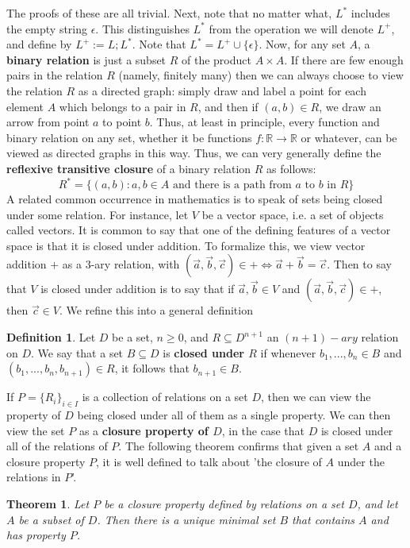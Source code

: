 \documentclass{article}
\theoremstyle{definition}
\newtheorem{definition}{Definition}[section]
\theoremstyle{plain}
\theoremstyle{theorem}
\newtheorem{theorem}{Theorem}[section]
\begin{document}
The proofs of these are all trivial. Next, note that no matter what, $L^*$ includes the empty string $\epsilon$. This distinguishes $L^*$ from the operation we will denote $L^+$, and define by $L^+ := L;L^*$. Note that $L^* = L^+ \cup \{\epsilon\}$.
Now, for any set $A$, a \textbf{binary relation} is just a subset $R$ of the product $A \times A$. If there are few enough pairs in the relation $R$ (namely, finitely many) then we can always choose to view the relation $R$ as a directed graph: simply draw and label a point for each element $A$ which belongs to a pair in $R$, and then if $(a,b) \in R$, we draw an arrow from point $a$ to point $b$. Thus, at least in principle, every function and binary relation on any set, whether it be functions $f:\mathbb{R} \to \mathbb{R}$ or whatever, can be viewed as directed graphs in this way. Thus, we can very generally define the \textbf{reflexive transitive closure} of a binary relation $R$ as follows:
 \[ R^* = \{ (a,b): a,b \in A \textrm{ and there is a path from $a$ to $b$ in $R$} \} \]
A related common occurrence in mathematics is to speak of sets being closed under some relation. For instance, let $V$ be a vector space, i.e. a set of objects called vectors. It is common to say that one of the defining features of a vector space is that it is closed under addition. To formalize this, we view vector addition $+$ as a $3$-ary relation, with $(\vec{a},\vec{b},\vec{c}) \in + \iff \vec{a}+\vec{b}=\vec{c}$. Then to say that $V$ is closed under addition is to say that if $\vec{a},\vec{b} \in V$ and $(\vec{a},\vec{b},\vec{c}) \in +$, then $\vec{c} \in V$. We refine this into a general definition
\begin{definition}
	Let $D$ be a set, $n \geq 0$, and $R \subseteq D^{n+1}$ an $(n+1)-ary$ relation on $D$. We say that a set $B \subseteq D$ is \textbf{closed under $R$} if whenever $b_1,...,b_n \in B$ and $(b_1,...,b_n,b_{n+1}) \in R$, it follows that $b_{n+1} \in B$. 
\end{definition}
If $P = \{R_i\}_{i \in I}$ is a collection of relations on a set $D$, then we can view the property of $D$ being closed under all of them as a single property. We can then view the set $P$ as a \textbf{closure property of $D$}, in the case that $D$ is closed under all of the relations of $P$. The following theorem confirms that given a set $A$ and a closure property $P$, it is well defined to talk about 'the closure of $A$ under the relations in $P$'.
\begin{theorem}
	Let $P$ be a closure property defined by relations on a set $D$, and let $A$ be a subset of $D$. Then there is a unique minimal set $B$ that contains $A$ and has property $P$.
\end{theorem}
\end{document}
